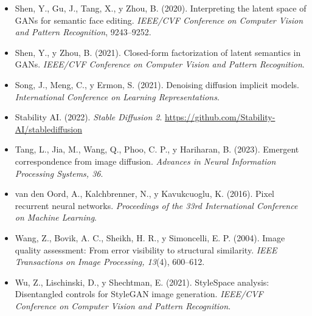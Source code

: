 \documentclass[12pt, a4paper, twoside]{book}
\begin{document}
\begin{itemize}[leftmargin=1.5em, itemsep=4pt]
\item Shen, Y., Gu, J., Tang, X., y Zhou, B. (2020). Interpreting the latent space of GANs for semantic face editing. \textit{IEEE/CVF Conference on Computer Vision and Pattern Recognition}, 9243--9252.

\item Shen, Y., y Zhou, B. (2021). Closed-form factorization of latent semantics in GANs. \textit{IEEE/CVF Conference on Computer Vision and Pattern Recognition}.

\item Song, J., Meng, C., y Ermon, S. (2021). Denoising diffusion implicit models. \textit{International Conference on Learning Representations}.

\item Stability AI. (2022). \textit{Stable Diffusion 2}. \url{https://github.com/Stability-AI/stablediffusion}

\item Tang, L., Jia, M., Wang, Q., Phoo, C. P., y Hariharan, B. (2023). Emergent correspondence from image diffusion. \textit{Advances in Neural Information Processing Systems, 36}.

\item van den Oord, A., Kalchbrenner, N., y Kavukcuoglu, K. (2016). Pixel recurrent neural networks. \textit{Proceedings of the 33rd International Conference on Machine Learning}.

\item Wang, Z., Bovik, A. C., Sheikh, H. R., y Simoncelli, E. P. (2004). Image quality assessment: From error visibility to structural similarity. \textit{IEEE Transactions on Image Processing, 13}(4), 600--612.

\item Wu, Z., Lischinski, D., y Shechtman, E. (2021). StyleSpace analysis: Disentangled controls for StyleGAN image generation. \textit{IEEE/CVF Conference on Computer Vision and Pattern Recognition}.

\end{itemize}
\end{document}
